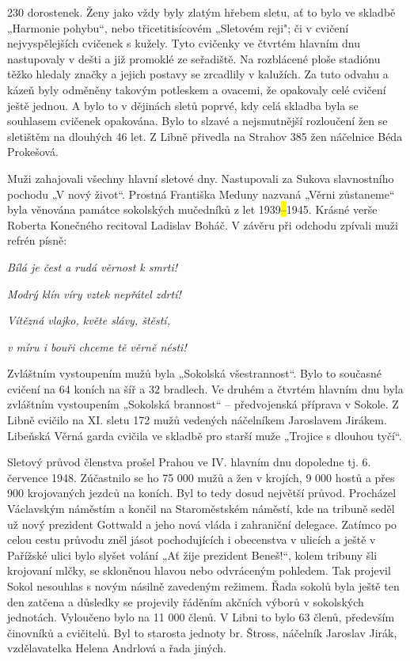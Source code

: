 230 dorostenek. Ženy jako vždy byly zlatým hřebem sletu, ať to bylo ve
skladbě „Harmonie pohybu``, nebo třicetitisícovém „Sletovém reji"; či v
cvičení nejvyspělejších cvičenek s kužely. Tyto cvičenky ve čtvrtém
hlavním dnu nastupovaly v dešti a již promoklé ze seřadiště. Na
rozblácené ploše stadiónu těžko hledaly značky a jejich postavy se
zrcadlily v kalužích. Za tuto odvahu a kázeň byly odměněny takovým
potleskem a ovacemi, že opakovaly celé cvičení ještě jednou. A bylo to v
dějinách sletů poprvé, kdy celá skladba byla se souhlasem cvičenek
opakována. Bylo to slzavé a nejsmutnější rozloučení žen se sletištěm na
dlouhých 46 let. Z Libně přivedla na Strahov 385 žen náčelnice Béda
Prokešová.

Muži zahajovali všechny hlavní sletové dny. Nastupovali za Sukova
slavnostního pochodu „V nový život``. Prostná Františka Meduny nazvaná
„Věrni zůstaneme`` byla věnována památce sokolských mučedníků z let
1939\hl{--}1945. Krásné verše Roberta Konečného recitoval Ladislav
Boháč. V závěru při odchodu zpívali muži refrén písně:

\emph{Bílá je čest a rudá věrnost k smrti!}

\emph{Modrý klín víry vztek nepřátel zdrtí!}

\emph{Vítězná vlajko, květe slávy, štěstí,}

\emph{v míru i bouři chceme tě věrně nésti!}

Zvláštním vystoupením mužů byla „Sokolská všestrannost``. Bylo to
současné cvičení na 64 koních na šíř a 32 bradlech. Ve druhém a čtvrtém
hlavním dnu byla zvláštním vystoupením „Sokolská brannost`` --
předvojenská příprava v Sokole. Z Libně cvičilo na XI. sletu 172 mužů
vedených náčelníkem Jaroslavem Jirákem. Libeňská Věrná garda cvičila ve
skladbě pro starší muže „Trojice s dlouhou tyčí``.

Sletový průvod členstva prošel Prahou ve IV. hlavním dnu dopoledne tj.
6. července 1948. Zúčastnilo se ho 75 000 mužů a žen v krojích, 9 000
hostů a přes 900 krojovaných jezdců na koních. Byl to tedy dosud
největší průvod. Procházel Václavským náměstím a končil na Staroměstském
náměstí, kde na tribuně seděl už nový prezident Gottwald a jeho nová
vláda i zahraniční delegace. Zatímco po celou cestu průvodu zněl jásot
pochodujících i obecenstva v ulicích a ještě v Pařížské ulici bylo
slyšet volání „Ať žije prezident Beneš!{}``, kolem tribuny šli krojovaní
mlčky, se skloněnou hlavou nebo odvráceným pohledem. Tak projevil Sokol
nesouhlas s novým násilně zavedeným režimem. Řada sokolů byla ještě ten
den zatčena a důsledky se projevily řáděním akčních výborů v sokolských
jednotách. Vyloučeno bylo na 11 000 členů. V Libni to bylo 63 členů,
především činovníků a cvičitelů. Byl to starosta jednoty br. Štross,
náčelník Jaroslav Jirák, vzdělavatelka Helena Andrlová a řada jiných.


